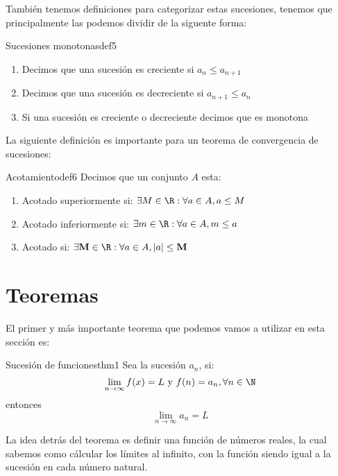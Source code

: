 \documentclass[12pt,a4paper]{article}
\begin{document}
También tenemos definiciones para categorizar estas sucesiones, tenemos que principalmente las podemos dividir de la siguente forma:

\begin{definicion}{Sucesiones monotonas}{def5}
    \begin{enumerate}
        \item Decimos que una sucesión es creciente si $a_n \leq a_{n + 1}$
        \item Decimos que una sucesión es decreciente si $a_{n + 1} \leq {a_n}$
        \item Si una sucesión es creciente o decreciente decimos que es monotona
    \end{enumerate}
\end{definicion}

La siguiente definición es importante para un teorema de convergencia de sucesiones:

\begin{definicion}{Acotamiento}{def6}
    Decimos que un conjunto $A$ esta:
    \begin{enumerate}
        \item Acotado superiormente si: $\exists M \in \R: \forall a \in A, a \leq M$
        \item Acotado inferiormente si: $\exists m \in \R: \forall a \in A, m \leq a$
        \item Acotado si: $\exists \mathbf{M} \in \R: \forall a \in A, |a| \leq \mathbf{M}$
    \end{enumerate}
\end{definicion}

\section{Teoremas}

El primer y más importante teorema que podemos vamos a utilizar en esta sección es:

\begin{teorema}{Sucesión de funciones}{thm1}
    Sea la sucesión $a_n$, si:
    \[ 
        \lim_{n \to \infty} f(x) = L \text{ y } f(n) = a_n, \forall n \in \N
    \]
    entonces
    \[ 
        \lim_{n \to \infty} a_n = L
    \]
\end{teorema}

La idea detrás del teorema es definir una función de números reales, la cual sabemos como cálcular los límites al infinito, con la función siendo igual a la sucesión en cada número natural.\\
\end{document}
